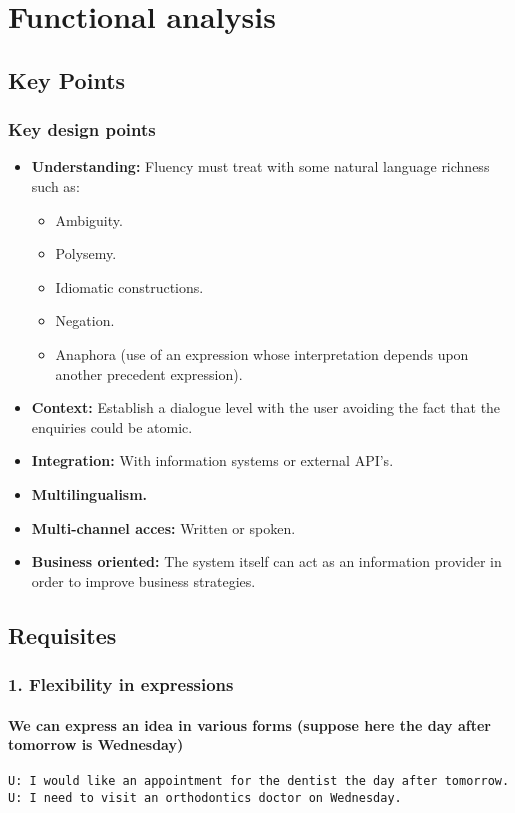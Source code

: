 \documentclass[11pt]{beamer}
\newcommand{\user}[1]{{\color{teal}\texttt{U: #1}}\\}
\begin{document}
\section{Functional analysis}

\subsection{Key Points}

\begin{frame}
\frametitle{Key design points}
\begin{itemize}
	\item \textbf{Understanding:} Fluency must treat with some natural language richness such as:
	\begin{itemize}
		\item Ambiguity.
		\item Polysemy.
		\item Idiomatic constructions.
		\item Negation.
		\item Anaphora (use of an expression whose interpretation depends upon another precedent expression).
	\end{itemize}
	\item \textbf{Context: } Establish a dialogue level with the user avoiding the fact that the enquiries could be atomic.
	\item \textbf{Integration: } With information systems or external API's.
	\item \textbf{Multilingualism.}
	\item \textbf{Multi-channel acces: } Written or spoken.
	\item \textbf{Business oriented: }The system itself can act as an information provider in order to improve business strategies.
\end{itemize}
\end{frame}

\subsection{Requisites}
	
\begin{frame}
\frametitle{1. Flexibility in expressions}
\framesubtitle{We can express an idea in various forms (suppose here the day after tomorrow is Wednesday)} 
\user{I would like an appointment for the dentist the day after tomorrow.}
\vspace{10pt}
\user{I need to visit an orthodontics doctor on Wednesday.}
\end{frame}
\end{document}
